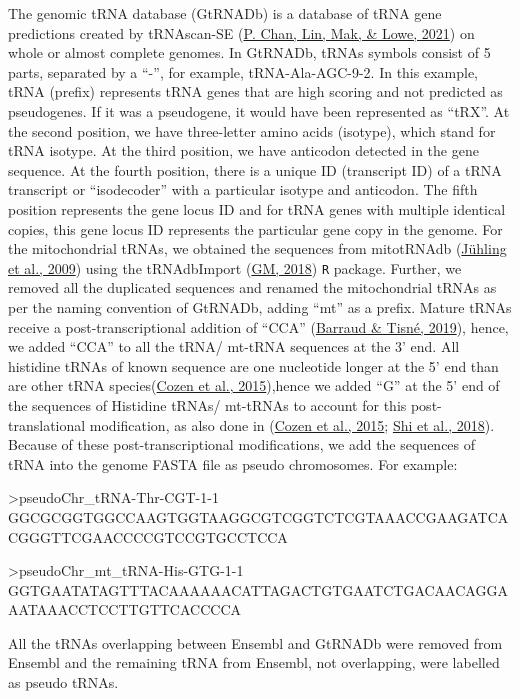 \documentclass[12pt,twoside]{reedthesis}
\newenvironment{Shaded}{\begin{snugshade}}{\end{snugshade}}
\newcommand{\NormalTok}[1]{#1}
\begin{document}
The genomic tRNA database (GtRNADb) is a database of tRNA gene
predictions created by tRNAscan-SE (\protect\hyperlink{ref-chan2021}{P. Chan, Lin, Mak, \& Lowe, 2021}) on whole or almost
complete genomes. In GtRNADb, tRNAs symbols consist of 5 parts,
separated by a ``-'', for example, tRNA-Ala-AGC-9-2. In this example, tRNA
(prefix) represents tRNA genes that are high scoring and not predicted
as pseudogenes. If it was a pseudogene, it would have been represented
as ``tRX''. At the second position, we have three-letter amino acids
(isotype), which stand for tRNA isotype. At the third position, we have
anticodon detected in the gene sequence. At the fourth position, there
is a unique ID (transcript ID) of a tRNA transcript or ``isodecoder'' with
a particular isotype and anticodon. The fifth position represents the
gene locus ID and for tRNA genes with multiple identical copies, this
gene locus ID represents the particular gene copy in the genome. For the
mitochondrial tRNAs, we obtained the sequences from mitotRNAdb
(\protect\hyperlink{ref-juxfchling2009}{Jühling et al., 2009}) using the tRNAdbImport (\protect\hyperlink{ref-gm2018}{GM, 2018}) \texttt{R} package. Further, we
removed all the duplicated sequences and renamed the mitochondrial tRNAs
as per the naming convention of GtRNADb, adding ``mt'' as a prefix. Mature
tRNAs receive a post-transcriptional addition of ``CCA'' (\protect\hyperlink{ref-barraud2019}{Barraud \& Tisné, 2019}),
hence, we added ``CCA'' to all the tRNA/ mt-tRNA sequences at the 3' end.
All histidine tRNAs of known sequence are one nucleotide longer at the
5' end than are other tRNA species(\protect\hyperlink{ref-cozen2015}{Cozen et al., 2015}),hence we added ``G'' at the 5' end of the sequences of Histidine tRNAs/ mt-tRNAs to account for this post-translational modification, as also
done in (\protect\hyperlink{ref-cozen2015}{Cozen et al., 2015}; \protect\hyperlink{ref-shi2018}{Shi et al., 2018}). Because of these post-transcriptional
modifications, we add the sequences of tRNA into the genome FASTA file
as pseudo chromosomes. For example:
\begin{Shaded}
\begin{Highlighting}[]
\NormalTok{\textgreater{}pseudoChr\_tRNA{-}Thr{-}CGT{-}1{-}1}
\NormalTok{GGCGCGGTGGCCAAGTGGTAAGGCGTCGGTCTCGTAAACCGAAGATCACGGGTTCGAACCCCGTCCGTGCCTCCA}

\NormalTok{\textgreater{}pseudoChr\_mt\_tRNA{-}His{-}GTG{-}1{-}1}
\NormalTok{GGTGAATATAGTTTACAAAAAACATTAGACTGTGAATCTGACAACAGGAAATAAACCTCCTTGTTCACCCCA}
\end{Highlighting}
\end{Shaded}
All the tRNAs overlapping between Ensembl and GtRNADb were removed from
Ensembl and the remaining tRNA from Ensembl, not overlapping, were
labelled as pseudo tRNAs.
\end{document}
